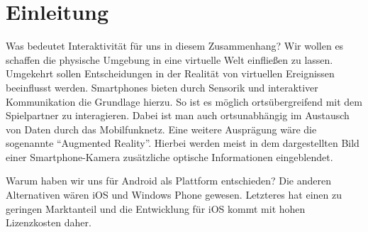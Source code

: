 \chapter{Einleitung}
Was bedeutet Interaktivität für uns in diesem Zusammenhang? Wir wollen es schaffen die physische Umgebung in eine virtuelle Welt einfließen zu lassen. Umgekehrt sollen Entscheidungen in der Realität von virtuellen Ereignissen beeinflusst werden.
Smartphones bieten durch Sensorik und interaktiver Kommunikation die Grundlage hierzu. So ist es möglich ortsübergreifend mit dem Spielpartner zu interagieren. Dabei ist man auch ortsunabhängig im Austausch von Daten durch das Mobilfunknetz. 
Eine weitere Ausprägung wäre die sogenannte “Augmented Reality”. Hierbei werden meist in dem dargestellten Bild einer Smartphone-Kamera zusätzliche optische Informationen eingeblendet.

Warum haben wir uns für Android als Plattform entschieden? Die anderen Alternativen wären iOS und Windows Phone gewesen. Letzteres hat einen zu geringen Marktanteil und die Entwicklung für iOS kommt mit hohen Lizenzkosten daher. 

\newpage
